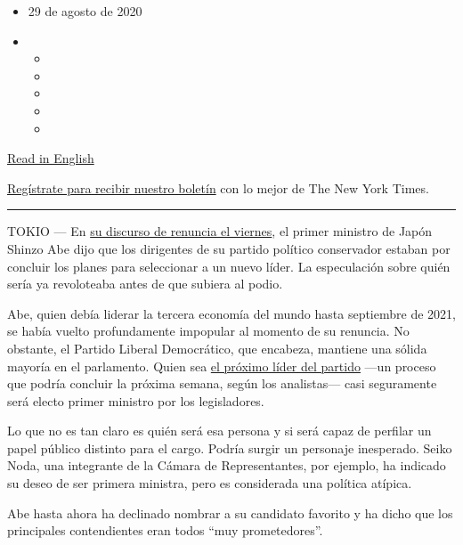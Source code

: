 \begin{itemize}
\item
  29 de agosto de 2020
\item
  \begin{itemize}
  \item
  \item
  \item
  \item
  \item
  \end{itemize}
\end{itemize}

\href{https://www.nytimes3xbfgragh.onion/2020/08/29/world/asia/japan-abe-successor.html}{Read
in English}

\href{https://www.nytimes3xbfgragh.onion/newsletters/el-times}{Regístrate
para recibir nuestro boletín} con lo mejor de The New York Times.

\begin{center}\rule{0.5\linewidth}{\linethickness}\end{center}

TOKIO --- En
\href{https://www.nytimes3xbfgragh.onion/2020/08/28/world/asia/shinzo-abe-resign-japan.html}{su
discurso de renuncia el viernes}, el primer ministro de Japón Shinzo Abe
dijo que los dirigentes de su partido político conservador estaban por
concluir los planes para seleccionar a un nuevo líder. La especulación
sobre quién sería ya revoloteaba antes de que subiera al podio.

Abe, quien debía liderar la tercera economía del mundo hasta septiembre
de 2021, se había vuelto profundamente impopular al momento de su
renuncia. No obstante, el Partido Liberal Democrático, que encabeza,
mantiene una sólida mayoría en el parlamento. Quien sea
\href{https://www.nytimes3xbfgragh.onion/2020/08/28/world/asia/japan-shinzo-abe-replacement.html}{el
próximo líder del partido} ---un proceso que podría concluir la próxima
semana, según los analistas--- casi seguramente será electo primer
ministro por los legisladores.

Lo que no es tan claro es quién será esa persona y si será capaz de
perfilar un papel público distinto para el cargo. Podría surgir un
personaje inesperado. Seiko Noda, una integrante de la Cámara de
Representantes, por ejemplo, ha indicado su deseo de ser primera
ministra, pero es considerada una política atípica.

Abe hasta ahora ha declinado nombrar a su candidato favorito y ha dicho
que los principales contendientes eran todos ``muy prometedores''.

